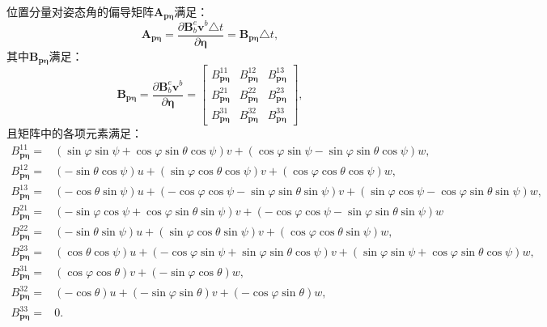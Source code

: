 位置分量对姿态角的偏导矩阵$\bm{A}_{\bm{p\eta}}$满足：
\begin{equation}
    \bm{A}_{\bm{p\eta}} = \frac{\partial \bm{B}_b^e \bm{v}^b \triangle t}{\partial \bm{\eta}} = \bm{B}_{\bm{p \eta}}\triangle t,
\end{equation}
其中$\bm{B}_{\bm{p \eta}}$满足：
\begin{equation}
    \bm{B}_{\bm{p \eta}} = \frac{\partial \bm{B}_b^e \bm{v}^b}{\partial \bm{\eta}} = 
    \begin{bmatrix}
        B_{\bm{p \eta}}^{11} & B_{\bm{p \eta}}^{12} & B_{\bm{p \eta}}^{13} \\
        B_{\bm{p \eta}}^{21} & B_{\bm{p \eta}}^{22} & B_{\bm{p \eta}}^{23} \\
        B_{\bm{p \eta}}^{31} & B_{\bm{p \eta}}^{32} & B_{\bm{p \eta}}^{33}
    \end{bmatrix},
\end{equation}
且矩阵中的各项元素满足：
\begin{equation}
    \begin{aligned}
        B_{\bm{p \eta}}^{11} =& (\sin\varphi \sin\psi + \cos\varphi \sin\theta \cos\psi)v + (\cos\varphi \sin\psi - \sin\varphi \sin\theta \cos\psi)w, \\
        B_{\bm{p \eta}}^{12} =& (-\sin\theta \cos\psi)u + (\sin\varphi \cos\theta \cos\psi)v + (\cos\varphi \cos\theta \cos\psi)w, \\
        B_{\bm{p \eta}}^{13} =& (-\cos\theta \sin\psi)u + (-\cos\varphi \cos\psi - \sin\varphi \sin\theta \sin\psi)v + (\sin\varphi \cos\psi - \cos\varphi \sin\theta \sin\psi)w, \\
        B_{\bm{p \eta}}^{21} =& (-\sin\varphi \cos\psi + \cos\varphi \sin\theta \sin\psi)v + (-\cos\varphi \cos\psi - \sin\varphi \sin\theta \sin\psi)w\\
        B_{\bm{p \eta}}^{22} =& (-\sin\theta \sin\psi)u + (\sin\varphi \cos\theta \sin\psi)v + (\cos\varphi \cos\theta \sin\psi)w, \\
        B_{\bm{p \eta}}^{23} =& (\cos\theta \cos\psi)u + (-\cos\varphi \sin\psi + \sin\varphi \sin\theta \cos\psi)v + (\sin\varphi \sin\psi + \cos\varphi \sin\theta \cos\psi)w, \\
        B_{\bm{p \eta}}^{31} =& (\cos\varphi \cos\theta)v + (-\sin\varphi \cos\theta)w, \\
        B_{\bm{p \eta}}^{32} =& (-\cos\theta)u + (-\sin\varphi \sin\theta)v + (-\cos\varphi \sin\theta)w, \\
        B_{\bm{p \eta}}^{33} =& 0.
    \end{aligned}
\end{equation}

